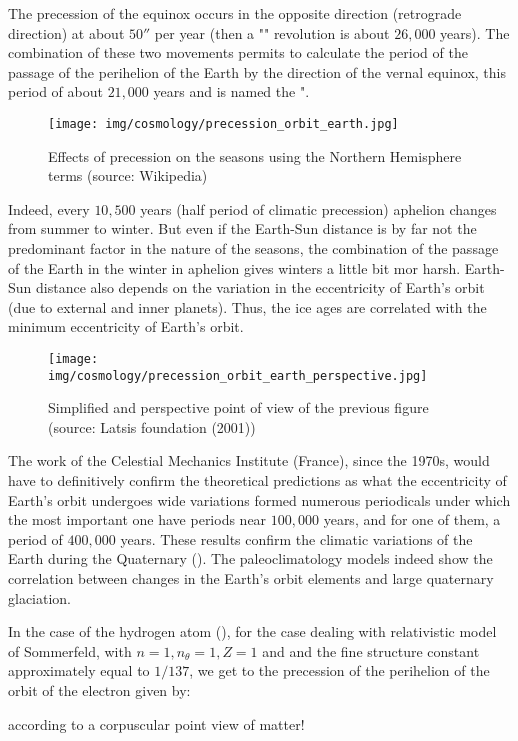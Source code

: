 	The precession of the equinox occurs in the opposite direction (retrograde direction) at about $50''$ per year (then a "" revolution is about $26,000$ years). The combination of these two movements permits to calculate the period of the passage of the perihelion of the Earth by the direction of the vernal equinox, this period of about $21,000$ years and is named the ".
	\begin{figure}[H]
		\begin{center}
		\texttt{[image: img/cosmology/precession\_orbit\_earth.jpg]}
		\end{center}	
		\caption{Effects of precession on the seasons using the Northern Hemisphere terms (source: Wikipedia)}
	\end{figure}
	Indeed, every $10,500$ years (half period of climatic precession) aphelion changes from summer to winter. But even if the Earth-Sun distance is by far not the predominant factor in the nature of the seasons, the combination of the passage of the Earth in the winter in aphelion gives winters a little bit mor harsh. Earth-Sun distance also depends on the variation in the eccentricity of Earth's orbit (due to external and inner planets). Thus, the ice ages are correlated with the minimum eccentricity of Earth's orbit.
	\begin{figure}[H]
		\begin{center}
		\texttt{[image: img/cosmology/precession\_orbit\_earth\_perspective.jpg]}
		\end{center}	
		\caption[]{Simplified and perspective point of view of the previous figure (source: Latsis foundation (2001))}
	\end{figure}
	The work of the Celestial Mechanics Institute (France), since the 1970s, would have to definitively confirm the theoretical predictions as what the eccentricity of Earth's orbit undergoes wide variations formed numerous periodicals under which the most important one have periods near $100,000$ years, and for one of them, a period of $400,000$ years. These results confirm the climatic variations of the Earth during the Quaternary (). The paleoclimatology models indeed show the correlation between changes in the Earth's orbit elements and large quaternary glaciation.
	\begin{tcolorbox}[title=Remark,colframe=black,arc=10pt]
	In the case of the hydrogen atom (), for the case dealing with relativistic model of Sommerfeld, with $n=1,n_\theta=1,Z=1$ and and the fine structure constant approximately equal to $1/137$, we get to the precession of the perihelion of the orbit of the electron given by:
	
	according to a corpuscular point view of matter!
	\end{tcolorbox}
	
